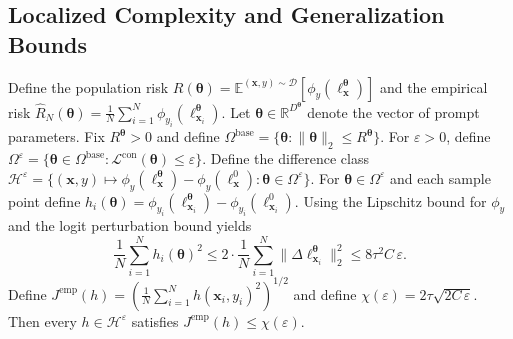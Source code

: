 \documentclass{article}
\theoremstyle{plain}
\theoremstyle{definition}
\theoremstyle{remark}
\begin{document}
	\subsection{Localized Complexity and Generalization Bounds}
	\label{app:localized_complexity}
	Define the population risk $R(\boldsymbol{\theta})=\mathbb E^{(\mathbf{x},y)\sim \mathcal{D}}[\phi_y(\boldsymbol{\ell}^{\boldsymbol{\theta}}_{\mathbf{x}})]$ and the empirical risk $\widehat R_{N}(\boldsymbol{\theta})=\frac1N\sum_{i=1}^N\phi_{y_i}(\boldsymbol{\ell}^{\boldsymbol{\theta}}_{\mathbf{x}_i})$. Let $\boldsymbol{\theta}\in\mathbb R^{D^{\boldsymbol{\theta}}}$ denote the vector of prompt parameters.
	Fix $R^{\boldsymbol{\theta}}>0$ and define $\Omega^{\mathrm{base}}=\{\boldsymbol{\theta}:\|\boldsymbol{\theta}\|_2\le R^{\boldsymbol{\theta}}\}$.
	For $\varepsilon>0$, define $\Omega^{\varepsilon}=\{\boldsymbol{\theta}\in\Omega^{\mathrm{base}}:\mathcal L^{\mathrm{con}}(\boldsymbol{\theta})\le \varepsilon\}$.
	Define the difference class $\mathcal{H}^{\varepsilon}=\{(\mathbf{x},y)\mapsto \phi_y(\boldsymbol{\ell}^{\boldsymbol{\theta}}_{\mathbf{x}})-\phi_y(\boldsymbol{\ell}^{0}_{\mathbf{x}}):\boldsymbol{\theta}\in\Omega^{\varepsilon}\}$.
	For $\boldsymbol{\theta}\in\Omega^{\varepsilon}$ and each sample point define $h_i(\boldsymbol{\theta})=\phi_{y_i}(\boldsymbol{\ell}^{\boldsymbol{\theta}}_{\mathbf{x}_i})-\phi_{y_i}(\boldsymbol{\ell}^{0}_{\mathbf{x}_i})$.
	Using the Lipschitz bound for $\phi_y$ and the logit perturbation bound yields
	\begin{equation*}
		\frac{1}{N}\sum_{i=1}^N h_i(\boldsymbol{\theta})^2
		\le
		2\cdot\frac{1}{N}\sum_{i=1}^N\|\Delta\boldsymbol{\ell}^{\boldsymbol{\theta}}_{\mathbf{x}_i}\|_2^2
		\le
		8\tau^2 C\,\varepsilon.
	\end{equation*}
	Define $J^{\mathrm{emp}}(h)=\left(\frac{1}{N}\sum_{i=1}^N h(\mathbf{x}_i,y_i)^2\right)^{1/2}$ and define $\chi(\varepsilon)=2\tau\sqrt{2C\,\varepsilon}$.
	Then every $h\in \mathcal{H}^{\varepsilon}$ satisfies $J^{\mathrm{emp}}(h)\le \chi(\varepsilon)$.
	
\end{document}
